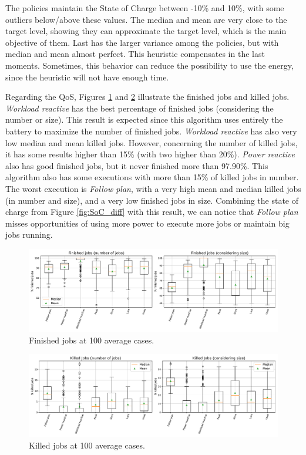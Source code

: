 The policies maintain the State of Charge between -10\% and 10\%, with some outliers below/above these values. The median and mean are very close to the target level, showing they can approximate the target level, which is the main objective of them. Last has the larger variance among the policies, but with median and mean almost perfect. This heuristic compensates in the last moments. Sometimes, this behavior can reduce the possibility to use the energy, since the heuristic will not have enough time. 

Regarding the QoS, Figures \ref{fig:finished_diff} and \ref{fig:killed_diff} illustrate the finished jobs and killed jobs. \emph{Workload reactive} has the best percentage of finished jobs (considering the number or size). This result is expected since this algorithm uses entirely the battery to maximize the number of finished jobs. \emph{Workload reactive} has also very low median and mean killed jobs. However, concerning the number of killed jobs, it has some results higher than 15\% (with two higher than 20\%). \emph{Power reactive} also has good finished jobs, but it never finished more than 97.90\%. This algorithm also has some executions with more than 15\% of killed jobs in number. The worst execution is \emph{Follow plan}, with a very high mean and median killed jobs (in number and size), and a very low finished jobs in size. Combining the state of charge from Figure \ref{fig:SoC_diff} with this result, we can notice that \emph{Follow plan} misses opportunities of using more power to execute more jobs or maintain big jobs running.

\begin{figure}[!htb]
    \centering
    \includegraphics[scale=0.38]{Images/Compensations/finished_diff.pdf}
    \caption{Finished jobs at 100 average cases.}
    \label{fig:finished_diff}
\end{figure}

\begin{figure}[!htb]
    \centering
    \includegraphics[scale=0.38]{Images/Compensations/killed_diff.pdf}
    \caption{Killed jobs at 100 average cases.}
    \label{fig:killed_diff}
\end{figure}

